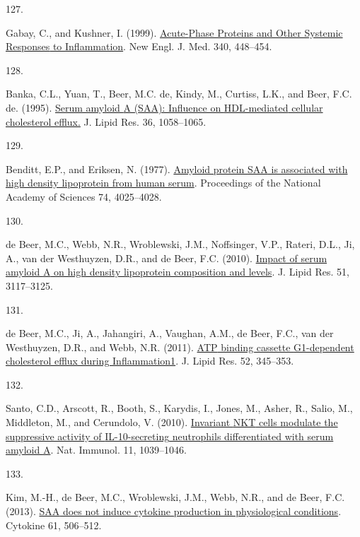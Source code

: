 \documentclass[
]{article}
\newlength{\cslhangindent}
\newlength{\csllabelwidth}
\newlength{\cslentryspacingunit} %
\newenvironment{CSLReferences}[2] %
 {%
  \setlength{\parindent}{0pt}
  \ifodd #1
  \let\oldpar\par
  \def\par{\hangindent=\cslhangindent\oldpar}
  \fi
  \setlength{\parskip}{#2\cslentryspacingunit}
 }%
 {}
\newcommand{\CSLLeftMargin}[1]{\parbox[t]{\csllabelwidth}{#1}}
\newcommand{\CSLRightInline}[1]{\parbox[t]{\linewidth - \csllabelwidth}{#1}\break}
\begin{document}
\begin{CSLReferences}{0}{0}
\leavevmode{}%
\CSLLeftMargin{127. }
\CSLRightInline{Gabay, C., and Kushner, I. (1999). \href{https://doi.org/10.1056/nejm199902113400607}{Acute-{Phase Proteins} and {Other Systemic Responses} to {Inflammation}}. New Engl. J. Med. 340, 448--454.}

\leavevmode{}%
\CSLLeftMargin{128. }
\CSLRightInline{Banka, C.L., Yuan, T., Beer, M.C. de, Kindy, M., Curtiss, L.K., and Beer, F.C. de. (1995). \href{https://www.ncbi.nlm.nih.gov/pubmed/7658153}{Serum amyloid {A} ({SAA}): Influence on {HDL-mediated} cellular cholesterol efflux.} J. Lipid Res. 36, 1058--1065.}

\leavevmode{}%
\CSLLeftMargin{129. }
\CSLRightInline{Benditt, E.P., and Eriksen, N. (1977). \href{https://doi.org/10.1073/pnas.74.9.4025}{Amyloid protein {SAA} is associated with high density lipoprotein from human serum}. Proceedings of the National Academy of Sciences 74, 4025--4028.}

\leavevmode{}%
\CSLLeftMargin{130. }
\CSLRightInline{de Beer, M.C., Webb, N.R., Wroblewski, J.M., Noffsinger, V.P., Rateri, D.L., Ji, A., van der Westhuyzen, D.R., and de Beer, F.C. (2010). \href{https://doi.org/10.1194/jlr.M005413}{Impact of serum amyloid {A} on high density lipoprotein composition and levels}. J. Lipid Res. 51, 3117--3125.}

\leavevmode{}%
\CSLLeftMargin{131. }
\CSLRightInline{de Beer, M.C., Ji, A., Jahangiri, A., Vaughan, A.M., de Beer, F.C., van der Westhuyzen, D.R., and Webb, N.R. (2011). \href{https://doi.org/10.1194/jlr.M012328}{{ATP} binding cassette {G1-dependent} cholesterol efflux during Inflammation1}. J. Lipid Res. 52, 345--353.}

\leavevmode{}%
\CSLLeftMargin{132. }
\CSLRightInline{Santo, C.D., Arscott, R., Booth, S., Karydis, I., Jones, M., Asher, R., Salio, M., Middleton, M., and Cerundolo, V. (2010). \href{https://doi.org/10.1038/ni.1942}{Invariant {NKT} cells modulate the suppressive activity of {IL-10-secreting} neutrophils differentiated with serum amyloid {A}}. Nat. Immunol. 11, 1039--1046.}

\leavevmode{}%
\CSLLeftMargin{133. }
\CSLRightInline{Kim, M.-H., de Beer, M.C., Wroblewski, J.M., Webb, N.R., and de Beer, F.C. (2013). \href{https://doi.org/10.1016/j.cyto.2012.10.019}{{SAA} does not induce cytokine production in physiological conditions}. Cytokine 61, 506--512.}


\end{CSLReferences}
\end{document}
